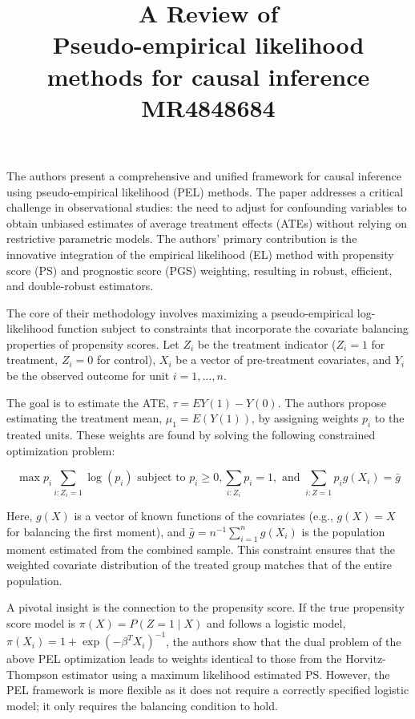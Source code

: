 \documentclass[11pt]{article}
\title{A Review of \\ Pseudo-empirical likelihood methods for
	causal inference \\MR4848684}
\begin{document}
	\maketitle	
	
The authors present a comprehensive and unified framework for causal inference using pseudo-empirical likelihood (PEL) methods. The paper addresses a critical challenge in observational studies: the need to adjust for confounding variables to obtain unbiased estimates of average treatment effects (ATEs) without relying on restrictive parametric models. The authors' primary contribution is the innovative integration of the empirical likelihood (EL) method with propensity score (PS) and prognostic score (PGS) weighting, resulting in robust, efficient, and double-robust estimators.

The core of their methodology involves maximizing a pseudo-empirical log-likelihood function subject to constraints that incorporate the covariate balancing properties of propensity scores. Let $Z_i$ be the treatment indicator ($Z_i = 1$ for treatment, $Z_i = 0$ for control), $X_i$ be a vector of pre-treatment covariates, and $Y_i$ be the observed outcome for unit $i = 1, \ldots, n$.

The goal is to estimate the ATE, $\tau = E{Y(1) - Y(0)}$. The authors propose estimating the treatment mean, $\mu_1 = E(Y(1))$, by assigning weights $p_i$ to the treated units. These weights are found by solving the following constrained optimization problem:

$$
\max{p_i}\sum_{i: Z_i = 1} \log(p_i)  \text{ subject to } p_i \ge 0, \sum_{i: Z_i}p_i = 1, \text{ and } \sum_{i: Z = 1} p_i g(X_i) = \bar{g}
$$

Here, $g(X)$ is a vector of known functions of the covariates (e.g., $g(X) = X$ for balancing the first moment), and $\bar{g} = n^{-1} \sum_{i=1}^n g(X_i)$ is the population moment estimated from the combined sample. This constraint ensures that the weighted covariate distribution of the treated group matches that of the entire population.

A pivotal insight is the connection to the propensity score. If the true propensity score model is $\pi(X) = P(Z=1 \mid X)$ and follows a logistic model, $\pi(X_i) = {1 + \exp(-\beta^T X_i)}^{-1}$, the authors show that the dual problem of the above PEL optimization leads to weights identical to those from the Horvitz-Thompson estimator using a maximum likelihood estimated PS. However, the PEL framework is more flexible as it does not require a correctly specified logistic model; it only requires the balancing condition to hold.
\end{document}
